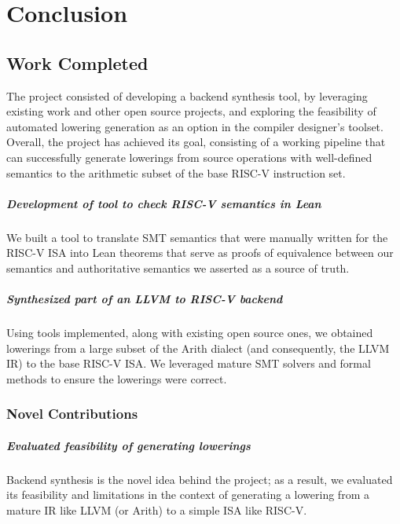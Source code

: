 \clearpage
\chapter{Conclusion}
\label{ch:conc}


\section{Work Completed}

The project consisted of developing a backend synthesis tool, by leveraging
existing work and other open source projects, and exploring the feasibility of automated lowering
generation as an option in the compiler designer's toolset. Overall, the project has achieved 
its goal, consisting of a working pipeline that can successfully generate lowerings from
source operations with well-defined semantics to the arithmetic subset of the base RISC-V 
instruction set.

\paragraph{Development of tool to check RISC-V semantics in Lean}

We built a tool to translate SMT semantics that were manually written for the RISC-V
ISA into Lean theorems that serve as proofs of equivalence between our semantics and
authoritative semantics we asserted as a source of truth.

\paragraph{Synthesized part of an LLVM to RISC-V backend}

Using tools implemented, along with existing open source ones, we obtained lowerings from 
a large subset of the Arith dialect (and consequently, the LLVM IR) to the base RISC-V ISA. 
We leveraged mature SMT solvers and formal methods to ensure the lowerings were correct.

\subsection{Novel Contributions}

\paragraph{Evaluated feasibility of generating lowerings}

Backend synthesis is the novel idea behind the project; as a result, we evaluated its feasibility
and limitations in the context of generating a lowering from a mature IR like LLVM (or Arith)
to a simple ISA like RISC-V.

